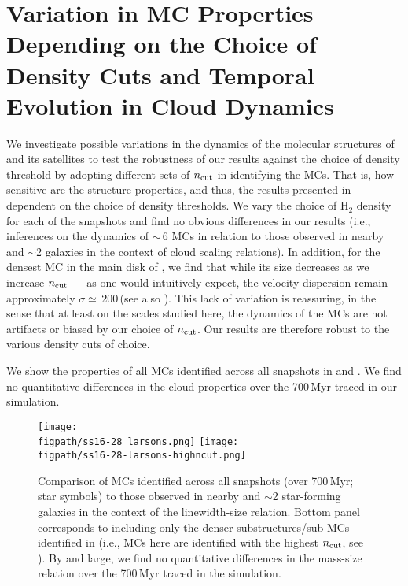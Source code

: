 \IfFileExists{emulateapjlegacy.cls}{\documentclass[iop]{emulateapjlegacy}}{\documentclass[iop]{emulateapj}}
\begin{document}



\appendix
\section{Variation in MC Properties Depending on the Choice of Density Cuts and
Temporal Evolution in Cloud Dynamics}    \label{sec:ncut}
We investigate possible variations in the dynamics of the molecular structures of \flower and its satellites
to test
the robustness of our results against the choice of density threshold by adopting
different sets of $n_{\rm cut}$ in identifying the MCs.
That is, how sensitive are the structure properties, and thus, the results presented in 
dependent on the choice of density thresholds.
We vary the choice of H$_2$ density for each of the snapshots and
find no obvious differences in our results (i.e., inferences on the dynamics of \z$\sim$\,6
MCs in relation to those observed in nearby and \z$\sim$2 galaxies in the context of
cloud scaling relations).
In addition, for the densest MC in the main disk of \flower, we find that while
its size decreases as we increase $n_{\rm cut}$ --- as one would intuitively expect,
the velocity dispersion remain approximately $\sigma\simeq$\,200\,\kms (see also ).
This lack of variation is reassuring, in the sense that at least on the scales studied here,
the dynamics of the MCs are not artifacts or biased by our choice of $n_{\rm cut}$.
Our results are therefore robust to the various density cuts of choice.

We show the properties of all MCs identified across all snapshots
in  and .
We find no quantitative differences in the cloud properties over the 700\,Myr traced in our simulation.



\begin{figure*}[htbp]
\centering
\texttt{[image: \\figpath/ss16-28\_larsons.png]}
\texttt{[image: \\figpath/ss16-28-larsons-highncut.png]}
\caption{
Comparison of MCs identified across all snapshots (over 700\,Myr; star symbols)
to those observed in nearby and \z$\sim$2 star-forming galaxies
in the context of the linewidth-size relation.
Bottom panel corresponds to including only the denser substructures/sub-MCs identified in \flower
(i.e., MCs here are identified with the highest $n_{\rm cut}$, see ).
By and large, we find no quantitative differences in the mass-size relation over the 700\,Myr traced in the simulation.
\label{fig:larsons16-28}}
\end{figure*}
\end{document}
